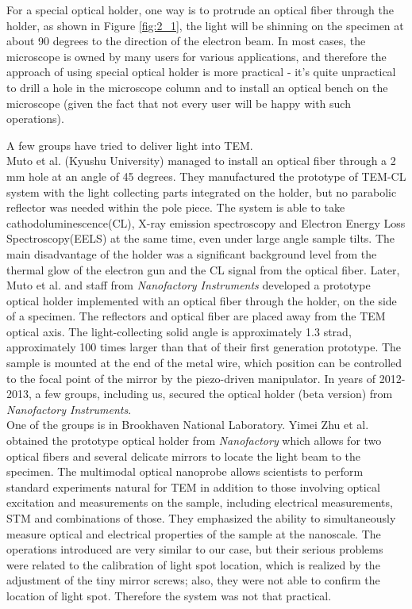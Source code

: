 For a special optical holder, one way is to protrude an optical fiber through the holder, as shown in Figure \ref{fig:2_1}, the light will be shinning on the specimen at about 90 degrees to the direction of the electron beam. In most cases, the microscope is owned by many users for various applications, and therefore the approach of using special optical holder is more practical - it's quite unpractical to drill a hole in the microscope column and to install an optical bench on the microscope (given the fact that not every user will be happy with such operations). 

A few groups have tried to deliver light into TEM. \\

Muto et al. (Kyushu University) managed to install an optical fiber through a 2 mm hole at an angle of 45 degrees.\cite{Tanabe2002,Furumoto2013} They manufactured the prototype of TEM-CL system with the light collecting parts integrated on the holder, but no parabolic reflector was needed within the pole piece. The system is able to take cathodoluminescence(CL), X-ray emission spectroscopy and Electron Energy Loss Spectroscopy(EELS) at the same time, even under large angle sample tilts. The main disadvantage of the holder was a significant background level from the thermal glow of the electron gun and the CL signal from the optical fiber. Later, Muto et al. and staff from {\em Nanofactory Instruments} developed a prototype optical holder implemented with an optical fiber through the holder, on the side of a specimen. The reflectors and optical fiber are placed away from the TEM optical axis. The light-collecting solid angle is approximately 1.3 strad, approximately 100 times larger than that of their first generation prototype. The sample is mounted at the end of the metal wire, which  position can be controlled to the focal point of the mirror by the piezo-driven manipulator. In years of 2012-2013, a few groups, including us, secured the optical holder (beta version) from {\em Nanofactory Instruments}. \\

One of the groups is in Brookhaven National Laboratory. Yimei Zhu et al. obtained the prototype optical holder from {\em Nanofactory} which allows for two optical fibers and several delicate mirrors to locate the light beam to the specimen. 
The multimodal optical nanoprobe allows scientists to perform standard experiments natural for TEM in addition to those involving optical excitation and measurements on the sample, including electrical measurements, STM and combinations of those. They emphasized the ability to simultaneously measure optical and electrical properties of the sample at the nanoscale.\cite{Zhu2012Multimodal}  The operations introduced are very similar to our case, but their serious problems were related to the calibration of light spot location, which is realized by the adjustment of the tiny mirror screws; also, they were not able to confirm the location of light spot. Therefore the system was not that practical. \\

